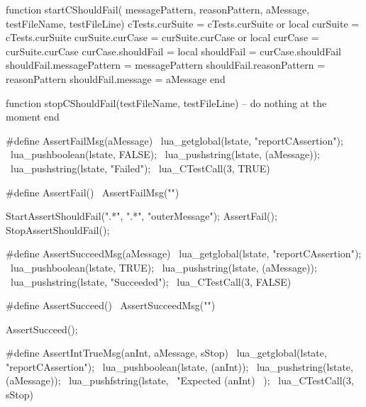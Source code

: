 \startLuaCode
function startCShouldFail(
  messagePattern, reasonPattern, aMessage,
  testFileName, testFileLine)
  cTests.curSuite    = cTests.curSuite or { }
  local curSuite     = cTests.curSuite
  curSuite.curCase   = curSuite.curCase or { }
  local curCase      = curSuite.curCase
  curCase.shouldFail = { }
  local shouldFail   = curCase.shouldFail
  shouldFail.messagePattern = messagePattern
  shouldFail.reasonPattern  = reasonPattern
  shouldFail.message        = aMessage
end

function stopCShouldFail(testFileName, testFileLine)
  -- do nothing at the moment
end
\stopLuaCode

\stopTestSuite

\startTestSuite[assertFail]

\startCHeader
#define AssertFailMsg(aMessage)              \
  lua_getglobal(lstate, "reportCAssertion"); \
  lua_pushboolean(lstate, FALSE);            \
  lua_pushstring(lstate, (aMessage));        \
  lua_pushstring(lstate, "Failed");          \
  lua_CTestCall(3, TRUE)
  
#define AssertFail() \
  AssertFailMsg("")
\stopCHeader


\startCTest
  StartAssertShouldFail(".*", ".*", "outerMessage");
    AssertFail();
  StopAssertShouldFail();
\stopCTest

\stopTestCase

\stopTestSuite

\startTestSuite[assertSucceed]

\startCHeader
#define AssertSucceedMsg(aMessage)           \
  lua_getglobal(lstate, "reportCAssertion"); \
  lua_pushboolean(lstate, TRUE);             \
  lua_pushstring(lstate, (aMessage));        \
  lua_pushstring(lstate, "Succeeded");       \
  lua_CTestCall(3, FALSE)

#define AssertSucceed() \
  AssertSucceedMsg("")
\stopCHeader


\startCTest
  AssertSucceed();
\stopCTest
\stopTestCase

\stopTestSuite

\startTestSuite[assertIntTrue]

\startCHeader
#define AssertIntTrueMsg(anInt, aMessage, sStop) \
  lua_getglobal(lstate, "reportCAssertion");     \
  lua_pushboolean(lstate, (anInt));              \
  lua_pushstring(lstate, (aMessage));            \
  lua_pushfstring(lstate,                        \
      "Expected %
      (anInt)                                    \
    );                                           \
  lua_CTestCall(3, sStop)

